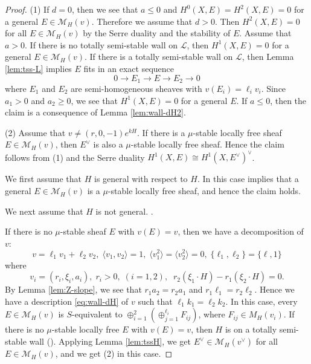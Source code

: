 \documentclass[10pt]{amsart}
\def\cal{\mathcal}
\newenvironment{NB}{
\color{red}{\bf NB}. \footnotesize 
}{}
\numberwithin{equation}{section}
\theoremstyle{plain}
\theoremstyle{definition}
\theoremstyle{remark}
\begin{document}
\begin{proof}
(1)
If $d=0$, then we see that $a \leq 0$ and $H^0(X,E)=H^2(X,E)=0$ for a general 
$E \in {\cal M}_H(v)$.
Therefore we assume that $d>0$. Then
$H^2(X,E)=0$ for all $E \in {\cal M}_H(v)$ by the Serre duality and the stability of $E$.
Assume that $a>0$.
If there is no totally semi-stable wall on ${\cal L}$, 
then $H^1(X,E)=0$ for a general $E \in {\cal M}_H(v)$.
If there is a totally semi-stable wall on ${\cal L}$, then
Lemma \ref{lem:tss-L} implies
$E$ fits in an exact sequence
$$
0 \to E_1 \to E \to E_2 \to 0
$$
where $E_1$ and $E_2$ are semi-homogeneous sheaves with
$v(E_i)=\ell_i v_i$.
Since $a_1>0$ and $a_2 \geq 0$, we see that
$H^1(X,E)=0$ for a general $E$. 
If $a \leq 0$, then the claim is a consequence of Lemma \ref{lem:wall-dH2}.


(2)
Assume that $v \ne (r,0,-1)e^{kH}$.
If there is a $\mu$-stable locally free sheaf $E \in {\cal M}_H(v)$, then
$E^{\vee}$ is also a $\mu$-stable locally free sheaf.
Hence the claim follows from (1) and the Serre duality
$H^1(X,E) \cong H^1(X,E^{\vee})^{\vee}$.


We first assume that $H$ is general with respect to $H$.
In this case \cite[Prop. 3.5]{KY} implies that 
a general $E \in {\cal M}_H(v)$ is a $\mu$-stable locally free sheaf, and hence the claim holds.

We next assume that $H$ is not general.
\begin{NB}
If there is no $\mu$-stable sheaf $E$ with $v(E)=v$, then
we have a decomposition of $v$:
\begin{equation}
v=\ell_1 v_1+\ell_2 v_2,\;\langle v_1,v_2 \rangle=1,\; \langle v_1^2 \rangle=\langle v_2^2 \rangle=0,\;
 \{\ell_1,\ell_2 \}=\{ \ell,1 \}
\end{equation}
where 
\begin{equation}
v_i=(r_i,\xi_i,a_i),\;r_i>0,\; (i=1,2),\;\; r_2(\xi_1 \cdot H)-r_1(\xi_2 \cdot H)=0.
\end{equation}
By Lemma \ref{lem:Z-slope}, we see that $r_1 a_2=r_2 a_1$ and $r_1 \ell_1=r_2 \ell_2$.
Hence we have a description \eqref{eq:wall-dH} of $v$ such that $\ell_1 k_1=\ell_2 k_2$.
In this case, every $E \in {\cal M}_H(v)$ is $S$-equivalent to $\oplus_{i=1}^2 (\oplus_{j=1}^{\ell_i} F_{ij})$,
where $F_{ij} \in M_H(v_i)$.
\end{NB}
If there is no $\mu$-stable locally free $E$ with $v(E)=v$, then
$H$ is on a totally semi-stable wall (\cite[Prop. 3.6]{KY}). Applying Lemma \ref{lem:tssH},
we get $E^{\vee} \in {\cal M}_H(v^{\vee})$ for all $E \in {\cal M}_H(v)$, and we get (2) in this case. 
\end{proof}
\end{document}
